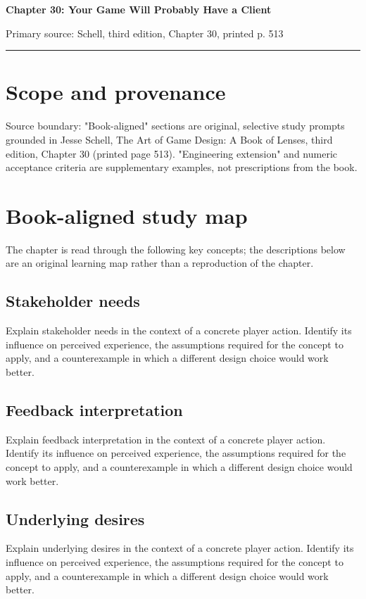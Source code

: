\documentclass[11pt]{article}
\begin{document}
{\huge\bfseries\color{suiteblue} Chapter 30: Your Game Will Probably Have a Client}\par
\vspace{0.15in}
{\normalsize\color{suitegray} Primary source: Schell, third edition, Chapter 30, printed p. 513}\par
\vspace{0.15in}\hrule\vspace{0.15in}

\section{Scope and provenance}
Source boundary: "Book-aligned" sections are original, selective study prompts grounded in Jesse Schell, The Art of Game Design: A Book of Lenses, third edition, Chapter 30 (printed page 513). "Engineering extension" and numeric acceptance criteria are supplementary examples, not prescriptions from the book.


\section{Book-aligned study map}
The chapter is read through the following key concepts; the descriptions below are an original learning map rather than a reproduction of the chapter.


\subsection{Stakeholder needs}
Explain stakeholder needs in the context of a concrete player action. Identify its influence on perceived experience, the assumptions required for the concept to apply, and a counterexample in which a different design choice would work better.


\subsection{Feedback interpretation}
Explain feedback interpretation in the context of a concrete player action. Identify its influence on perceived experience, the assumptions required for the concept to apply, and a counterexample in which a different design choice would work better.


\subsection{Underlying desires}
Explain underlying desires in the context of a concrete player action. Identify its influence on perceived experience, the assumptions required for the concept to apply, and a counterexample in which a different design choice would work better.
\end{document}
